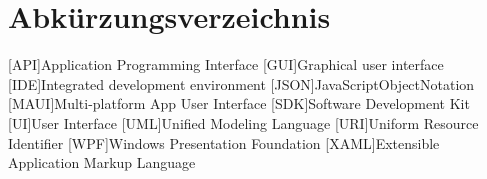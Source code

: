 \chapter{Abkürzungsverzeichnis}
\begin{acronym}[XAML]
[API]{Application Programming Interface}
[GUI]{Graphical user interface}
[IDE]{Integrated development environment}
[JSON]{JavaScriptObjectNotation}
[MAUI]{Multi-platform App User Interface}
[SDK]{Software Development Kit}
[UI]{User Interface}
[UML]{Unified Modeling Language}
[URI]{Uniform Resource Identifier}
[WPF]{Windows Presentation Foundation}
[XAML]{Extensible Application Markup Language}

\end{acronym}